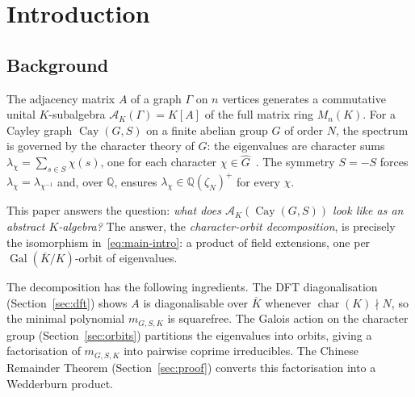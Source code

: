 \documentclass[12pt]{amsart}
\newcommand{\blfootnote}[1]{%
  \begingroup\renewcommand{\thefootnote}{}%
  \footnote{#1}\addtocounter{footnote}{-1}\endgroup}
\numberwithin{equation}{section}
\theoremstyle{plain}
\theoremstyle{definition}
\DeclareMathOperator{\Gal}{Gal}
\DeclareMathOperator{\ch}{char}
\DeclareMathOperator{\Cay}{Cay}
\newcommand{\Q}{\mathbb{Q}}
\newcommand{\calA}{\mathcal{A}}
\newcommand{\Ghat}{\widehat{G}}
\begin{document}

\maketitle
\setcounter{tocdepth}{2}

\section{Introduction}
\label{sec:intro}

\subsection{Background}

The adjacency matrix $A$ of a graph $\Gamma$ on $n$ vertices generates a
commutative unital $K$-subalgebra $\calA_K(\Gamma) = K[A]$ of the full
matrix ring $M_n(K)$.  For a Cayley graph $\Cay(G, S)$ on a finite abelian
group $G$ of order $N$, the spectrum is governed by the character theory of
$G$: the eigenvalues are character sums $\lambda_\chi = \sum_{s \in S}
\chi(s)$, one for each character $\chi \in \Ghat$~\cite{Ter99,BH12}.
The symmetry $S = -S$
forces $\lambda_\chi = \lambda_{\chi^{-1}}$ and, over $\Q$, ensures
$\lambda_\chi \in \Q(\zeta_N)^+$ for every $\chi$.

This paper answers the question: \emph{what does $\calA_K(\Cay(G,S))$
look like as an abstract $K$-algebra?}  The answer, the
\emph{character-orbit decomposition}, is precisely the isomorphism
in~\eqref{eq:main-intro}: a product of field extensions, one per
$\Gal(\overline{K}/K)$-orbit of eigenvalues.

The decomposition has the following ingredients.
The DFT diagonalisation (Section~\ref{sec:dft}) shows $A$ is diagonalisable
over $\overline{K}$ whenever $\ch(K) \nmid N$, so the minimal polynomial
$m_{G,S,K}$ is squarefree.  The Galois action on the character group
(Section~\ref{sec:orbits}) partitions the eigenvalues into orbits, giving
a factorisation of $m_{G,S,K}$ into pairwise coprime irreducibles.  The
Chinese Remainder Theorem (Section~\ref{sec:proof}) converts this
factorisation into a Wedderburn product.
\end{document}
